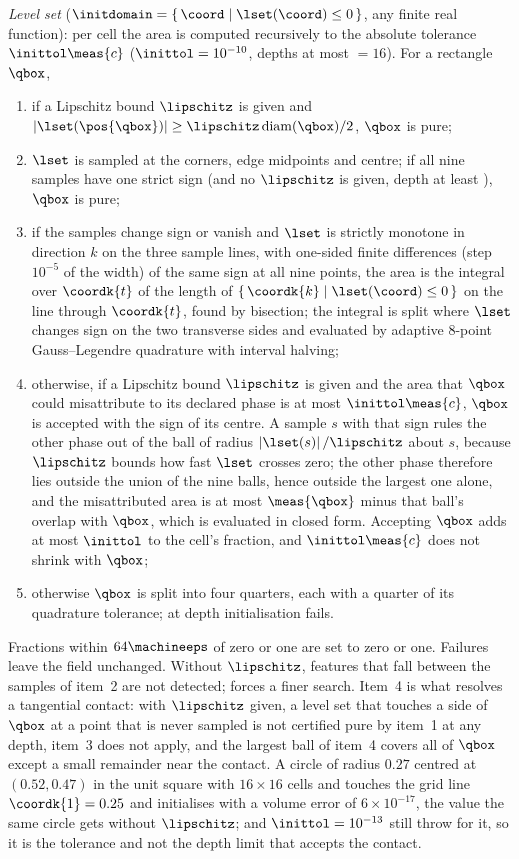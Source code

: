 \emph{Level set} ($\initdomain=\set{\coord}{\lset(\coord)\le0}$, any finite
real function): per cell the area is computed recursively to the absolute
tolerance $\inittol\meas{c}$ ($\inittol=10^{-10}$, depths at most
 $=16$). For a rectangle $\qbox$,
\begin{enumerate}
\item if a Lipschitz bound $\lipschitz$ is given and
  $\abs{\lset(\pos{\qbox})}\ge\lipschitz\operatorname{diam}(\qbox)/2$, $\qbox$
  is pure;
\item $\lset$ is sampled at the corners, edge midpoints and centre; if all nine
  samples have one strict sign (and no $\lipschitz$ is given, depth at least
  ), $\qbox$ is pure;
\item if the samples change sign or vanish and $\lset$ is strictly monotone in
  direction $k$ on the three sample lines, with one-sided finite differences
  (step $10^{-5}$ of the width) of the same sign at all nine points, the area is
  the integral over $\coordk{t}$ of the length of
  $\set{\coordk{k}}{\lset(\coord)\le0}$ on the line through $\coordk{t}$, found by
  bisection; the integral is split where $\lset$ changes sign on the two
  transverse sides and evaluated by adaptive 8-point Gauss--Legendre quadrature
  with interval halving;
\item otherwise, if a Lipschitz bound $\lipschitz$ is given and the area that
  $\qbox$ could misattribute to its declared phase is at most
  $\inittol\meas{c}$, $\qbox$ is accepted with the sign of its centre. A sample
  $s$ with that sign rules the other phase out of the ball of radius
  $\abs{\lset(s)}/\lipschitz$ about $s$, because $\lipschitz$ bounds how fast
  $\lset$ crosses zero; the other phase therefore lies outside the union of the
  nine balls, hence outside the largest one alone, and the misattributed area is
  at most $\meas{\qbox}$ minus that ball's overlap with $\qbox$, which is
  evaluated in closed form. Accepting $\qbox$ adds at most $\inittol$ to the
  cell's fraction, and $\inittol\meas{c}$ does not shrink with $\qbox$;
\item otherwise $\qbox$ is split into four quarters, each with a quarter of
  its quadrature tolerance; at depth  initialisation fails.
\end{enumerate}
Fractions within $64\machineeps$ of zero or one are set to zero or
one. Failures leave the field unchanged. Without $\lipschitz$, features that
fall between the samples of item~2 are not detected;  forces a
finer search. Item~4 is what resolves a tangential contact: with $\lipschitz$
given, a level set that touches a side of $\qbox$ at a point that is never
sampled is not certified pure by item~1 at any depth, item~3 does not apply, and
the largest ball of item~4 covers all of $\qbox$ except a small remainder
near the contact. A circle of radius $0.27$ centred at $(0.52,0.47)$ in the unit square
with $16\times16$ cells and  touches the grid line
$\coordk{1}=0.25$ and initialises with a volume error of $6\times10^{-17}$, the
value the same circle gets without $\lipschitz$;  and
$\inittol=10^{-13}$ still throw for it, so it is the tolerance and not the depth
limit that accepts the contact.

